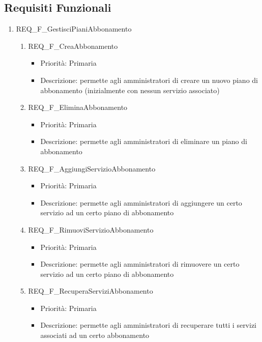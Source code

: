 \subsection{Requisiti Funzionali}
\begin{enumerate}
	

	\item REQ\_F\_GestisciPianiAbbonamento
		\begin{enumerate}[label*=\arabic*.]      
		\item REQ\_F\_CreaAbbonamento
			\begin{itemize}	
			\item Priorità: Primaria
			\item Descrizione: permette agli amministratori di creare un nuovo piano di abbonamento (inizialmente con nessun servizio associato)
			\end{itemize}
		\item REQ\_F\_EliminaAbbonamento
			\begin{itemize}	
			\item Priorità: Primaria
			\item Descrizione: permette agli amministratori di eliminare un piano di abbonamento
			\end{itemize}
			
		\item REQ\_F\_AggiungiServizioAbbonamento
			\begin{itemize}	
			\item Priorità: Primaria
			\item Descrizione: permette agli amministratori di aggiungere un certo servizio ad un certo piano di abbonamento
			\end{itemize}
	
		\item REQ\_F\_RimuoviServizioAbbonamento
			\begin{itemize}	
			\item Priorità: Primaria
			\item Descrizione: permette agli amministratori di rimuovere un certo servizio ad un certo piano di abbonamento
			\end{itemize}

		\item REQ\_F\_RecuperaServiziAbbonamento
			\begin{itemize}	
			\item Priorità: Primaria
			\item Descrizione: permette agli amministratori di recuperare tutti i servizi associati ad un certo abbonamento
			\end{itemize}
	

\end{enumerate}
\end{enumerate}

